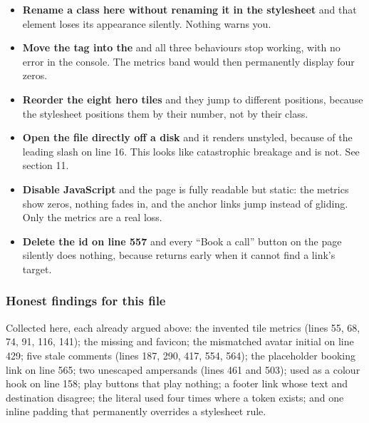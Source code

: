 \begin{itemize}
\item \textbf{Rename a class here without renaming it in the stylesheet} and that
  element loses its appearance silently. Nothing warns you.
\item \textbf{Move the  tag into the } and all three
  behaviours stop working, with no error in the console. The metrics band would
  then permanently display four zeros.
\item \textbf{Reorder the eight hero tiles} and they jump to different positions,
  because the stylesheet positions them by their number, not by their class.
\item \textbf{Open the file directly off a disk} and it renders unstyled, because
  of the leading slash on line 16. This looks like catastrophic breakage and is
  not. See section 11.
\item \textbf{Disable JavaScript} and the page is fully readable but static: the
  metrics show zeros, nothing fades in, and the anchor links jump instead of
  gliding. Only the metrics are a real loss.
\item \textbf{Delete the id on line 557} and every ``Book a call'' button on the
  page silently does nothing, because  returns early when it cannot
  find a link's target.
\end{itemize}

\subsubsection*{Honest findings for this file}

Collected here, each already argued above: the invented tile metrics (lines 55,
68, 74, 91, 116, 141); the missing  and favicon; the mismatched
avatar initial on line 429; five stale  comments (lines 187, 290,
417, 554, 564); the placeholder booking link on line 565; two unescaped ampersands
(lines 461 and 503);  used as a colour hook on line 158; play buttons
that play nothing; a footer link whose text and destination disagree; the
literal  used four times where a token exists; and one inline
padding that permanently overrides a stylesheet rule.
